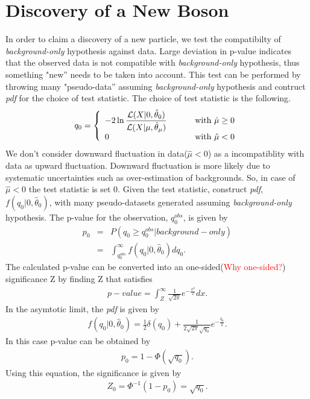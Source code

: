 \section{Discovery of a New Boson}
\label{sec:stat_significance}
In order to claim a discovery of a new particle, we test the compatibilty of 
\textit{background-only} hypothesis against data. Large deviation in p-value 
indicates that the observed data is not compatible with \textit{background-only} 
hypothesis, thus something "new'' needs to be taken into account. 
This test can be performed by throwing many "pseudo-data'' assuming 
\textit{background-only} hypothesis and contruct \textit{pdf} for the choice 
of test statistic. The choice of test statistic is the following. 
\begin{eqnarray} 
q_0
=
\left\{ \begin{array}{l l}
\displaystyle
-2 \ln \frac{\mathcal{L}( X | 0, \hat{\theta}_0)}
            {\mathcal{L}( X | \mu, \hat{\theta}_\mu)} 
             & \qquad \textrm{ with } \hat{\mu} \ge 0 \\   
0 
             & \qquad \textrm{ with } \hat{\mu} < 0    
\end{array} \right.
\end{eqnarray} 
We don't consider downward fluctuation in data($\hat{\mu} < 0$) as a 
incompatiblity with data as upward fluctuation. Downward fluctuation 
is more likely due to systematic uncertainties such as over-estimation 
of backgrounds. So, in case of $\hat{\mu} < 0$ the test statistic is 
set 0. Given the test statistic, construct \textit{pdf}, $f(q_0|0,\hat{\theta}_0)$, 
with many pseudo-datasets generated assuming \textit{background-only} hypothesis.
The p-value for the observation, $q_0^{obs}$, is given by 
\begin{eqnarray} 
p_0
&=& P \left( q_0 \ge q_0^{obs} | background-only \right)  \\
&=& \int^{\infty}_{ q_0^{obs} }  f\left( q_0 | 0, \hat{\theta}_0 \right) dq_0.
\end{eqnarray} 
The calculated p-value can be converted into an one-sided(\textcolor{red}{Why one-sided?}) 
significance Z by finding Z that satisfies 
\begin{eqnarray} 
p-value 
= 
\int^{\infty}_{Z} \frac{1}{\sqrt{2\pi}} e^{ -\frac{x^2}{2}} dx.   
\end{eqnarray} 
In the asymtotic limit, the \textit{pdf} is given by 
\begin{eqnarray} 
f\left(q_0 | 0, \hat{\theta}_0 \right) 
= 
\frac{1}{2} \delta \left(q_0\right)  
+ 
\frac{1}{2\sqrt{2\pi}\sqrt{q_0}} e^{-\frac{q_0}{2}}.
\end{eqnarray} 
In this case p-value can be obtained by 
\begin{eqnarray}
p_0 = 1 - \Phi \left( \sqrt{q_0} \right).
\end{eqnarray} 
Using this equation, the significance is given by  
\begin{eqnarray} 
Z_0 = \Phi^{-1} \left( 1 - p_0 \right) = \sqrt{q_0}.
\end{eqnarray} 


